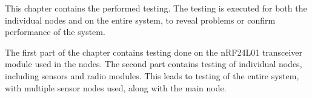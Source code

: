 This chapter contains the performed testing. The testing is executed for both the individual nodes and on the entire system, to reveal problems or confirm performance of the system.

The first part of the chapter contains testing done on the nRF24L01 transceiver module used in the nodes. The second part contains testing of individual nodes, including sensors and radio modules. This leads to testing of the entire system, with multiple sensor nodes used, along with the main node.




